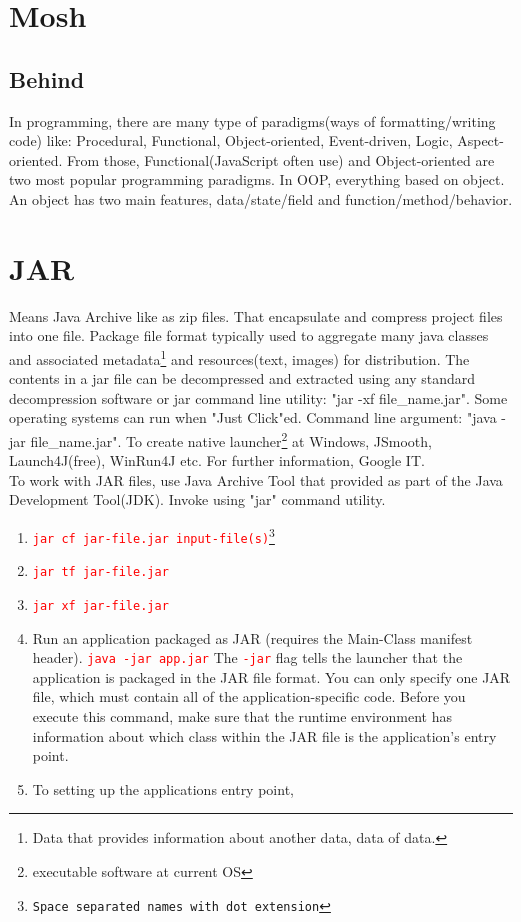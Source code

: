 \documentclass[10 pt]{article}
\newcommand{\R}{\textcolor{red}} %
\newcommand{\T}{\texttt}
\newcommand{\I}{\item}
\begin{document}
\section{Mosh}
\subsection{Behind}
In programming, there are many type of paradigms(ways of formatting/writing code) like: Procedural, Functional, Object-oriented, Event-driven, Logic, Aspect-oriented. From those, Functional(JavaScript often use) and Object-oriented are two most popular programming paradigms. In OOP, everything based on object. An object has two main features, data/state/field and function/method/behavior.

\section{JAR}
Means Java Archive like as zip files. That encapsulate and compress project files into one file. Package file format typically used to aggregate many java classes and associated metadata\footnote{Data that provides information about another data, data of data.} and resources(text, images) for distribution. The contents in a jar file can be decompressed and extracted using any standard decompression software or jar command line utility: "jar -xf file\_name.jar". Some operating systems can run when "Just Click"ed. Command line argument: "java -jar file\_name.jar". To create native launcher\footnote{executable software at current OS} at Windows, JSmooth, Launch4J(free), WinRun4J etc. For further information, Google IT. \\
To work with JAR files, use Java Archive Tool that provided as part of the Java Development Tool(JDK). Invoke using "jar" command utility.

\begin{enumerate}
	\I[Creating a jar: ] \R{\T{jar cf jar-file.jar input-file(s)\footnote{Space separated names with dot extension}}}
	\I[View contents: ] \R{\T{jar tf jar-file.jar}}
	\I[Extract contents: ] \R{\T{jar xf jar-file.jar}}
	\I[Run: ] Run an application packaged as JAR (requires the Main-Class manifest header). \R{\T{java -jar app.jar}} The \R{\T{-jar}} flag tells the launcher that the application is packaged in the JAR file format. You can only specify one JAR file, which must contain all of the application-specific code. Before you execute this command, make sure that the runtime environment has information about which class within the JAR file is the application's entry point.
	\I[Entry Point: ] To setting up the applications entry point,
\end{enumerate}
\end{document}

